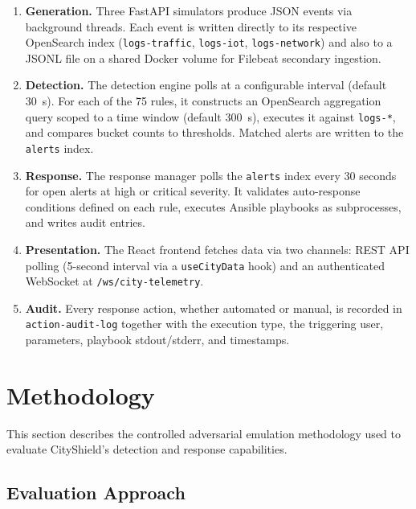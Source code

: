\documentclass[conference,10pt]{IEEEtran}
\begin{document}
\begin{enumerate}[leftmargin=*]
    \item \textbf{Generation.} Three FastAPI simulators produce JSON events via background threads. Each event is written directly to its respective OpenSearch index (\texttt{logs-traffic}, \texttt{logs-iot}, \texttt{logs-network}) and also to a JSONL file on a shared Docker volume for Filebeat secondary ingestion.

    \item \textbf{Detection.} The detection engine polls at a configurable interval (default 30~s). For each of the 75 rules, it constructs an OpenSearch aggregation query scoped to a time window (default 300~s), executes it against \texttt{logs-*}, and compares bucket counts to thresholds. Matched alerts are written to the \texttt{alerts} index.

    \item \textbf{Response.} The response manager polls the \texttt{alerts} index every 30 seconds for open alerts at high or critical severity. It validates auto-response conditions defined on each rule, executes Ansible playbooks as subprocesses, and writes audit entries.

    \item \textbf{Presentation.} The React frontend fetches data via two channels: REST API polling (5-second interval via a \texttt{useCityData} hook) and an authenticated WebSocket at \texttt{/ws/city-telemetry}.

    \item \textbf{Audit.} Every response action, whether automated or manual, is recorded in \texttt{action-audit-log} together with the execution type, the triggering user, parameters, playbook stdout/stderr, and timestamps.
\end{enumerate}

\section{Methodology}
\label{sec:methodology}

This section describes the controlled adversarial emulation methodology used to evaluate CityShield's detection and response capabilities.

\subsection{Evaluation Approach}
\end{document}
